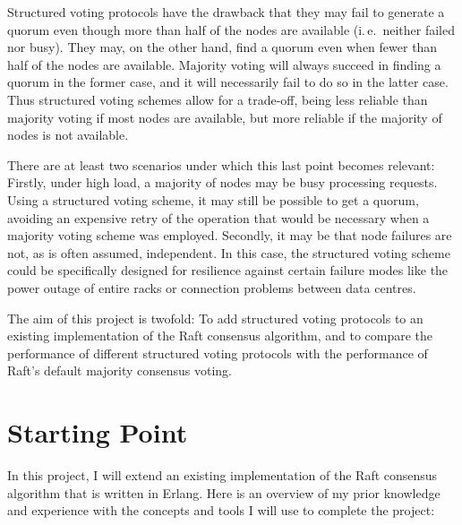 \documentclass[12pt]{scrartcl}
\begin{document}
Structured voting protocols have the drawback that they may fail to generate a quorum even though more than half of the nodes are available (i.\,e.\ neither failed nor busy). They may, on the other hand, find a quorum even when fewer than half of the nodes are available. Majority voting will always succeed in finding a quorum in the former case, and it will necessarily fail to do so in the latter case. Thus structured voting schemes allow for a trade-off, being less reliable than majority voting if most nodes are available, but more reliable if the majority of nodes is not available.

There are at least two scenarios under which this last point becomes relevant: Firstly, under high load, a majority of nodes may be busy processing requests. Using a structured voting scheme, it may still be possible to get a quorum, avoiding an expensive retry of the operation that would be necessary when a majority voting scheme was employed. Secondly, it may be that node failures are not, as is often assumed, independent. In this case, the structured voting scheme could be specifically designed for resilience against certain failure modes like the power outage of entire racks or connection problems between data centres.

The aim of this project is twofold: To add structured voting protocols to an existing implementation of the Raft consensus algorithm, and to compare the performance of different structured voting protocols with the performance of Raft's default majority consensus voting.


\section{Starting Point%
  \label{starting-point}%
}
%

In this project, I will extend an existing implementation of the Raft consensus algorithm that is written in Erlang. Here is an overview of my prior knowledge and experience with the concepts and tools I will use to complete the project:
\end{document}
